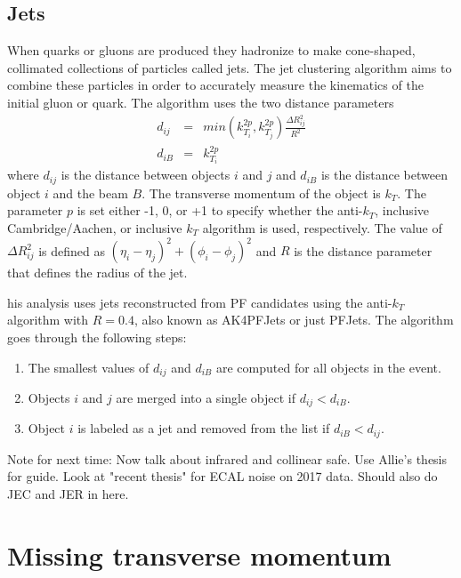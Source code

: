 \subsection{Jets}
When quarks or gluons are produced they hadronize to make cone-shaped, collimated collections of particles called jets.  The jet clustering algorithm aims to combine these particles in order to accurately measure the kinematics of the initial gluon or quark.  The algorithm uses the two distance parameters
\begin{eqnarray}
	d_{ij} &=& min(k_{T_i}^{2p},k_{T_j}^{2p})\frac{\Delta R_{ij}^2}{R^2} \\
	d_{iB} &=& k_{T_i}^{2p}
\end{eqnarray}
where $d_{ij}$ is the distance between objects $i$ and $j$ and $d_{iB}$ is the distance between object $i$ and the beam $B$.  The transverse momentum of the object is $k_T$.  The parameter $p$ is set either -1, 0, or +1 to specify whether the anti-$k_T$, inclusive Cambridge/Aachen, or inclusive $k_T$ algorithm is used, respectively.  The value of $\Delta R_{ij}^2$ is defined as $(\eta_i-\eta_j)^2+(\phi_i-\phi_j)^2$ and $R$ is the distance parameter that defines the radius of the jet.

his analysis uses jets reconstructed from PF candidates using the anti-$k_T$ algorithm with $R= 0.4$, also known as AK4PFJets or just PFJets. The algorithm goes through the following steps:
\begin{enumerate}
	\item The smallest values of $d_{ij}$ and $d_{iB}$ are computed for all objects in the event.
	\item Objects $i$ and $j$ are merged into a single object if $d_{ij}<d_{iB}$.  
	\item Object $i$ is labeled as a jet and removed from the list if $d_{iB}<d_{ij}$. 
\end{enumerate}

Note for next time:  
Now talk about infrared and collinear safe.  Use Allie's thesis for guide.
Look at "recent thesis" for ECAL noise on 2017 data.
Should also do JEC and JER in here. 


\section{Missing transverse momentum}

